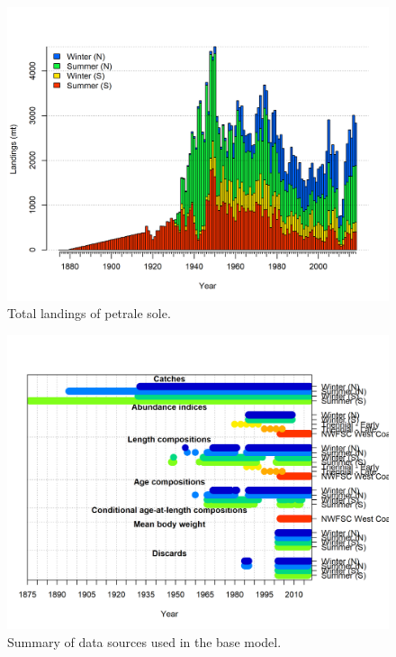 \documentclass[12pt,]{article}
\begin{document}
\begin{figure}
\centering
\includegraphics{r4ss/plots_mod1/catch2 landings stacked.png}
\caption{Total landings of petrale sole. \label{fig:Catch}}
\end{figure}

\FloatBarrier

\begin{figure}
\centering
\includegraphics{r4ss/plots_mod1/data_plot.png}
\caption{Summary of data sources used in the base model.
\label{fig:data_plot}}
\end{figure}

\FloatBarrier
\end{document}
